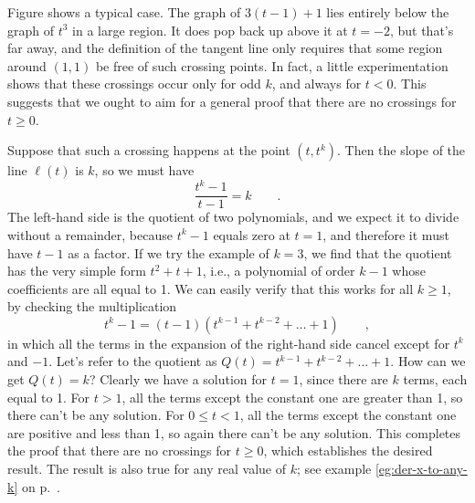 Figure  shows a typical case. 
The graph of $3(t-1)+1$ lies entirely below the graph of $t^3$ in a large region.
It does pop back up above it at $t=-2$, but that's far away, and the definition of
the tangent line only requires that some region around $(1,1)$ be free of such
crossing points. In fact, a little experimentation shows that these crossings occur
only for odd $k$, and always for $t<0$. This suggests that we ought to aim for
a general proof that there are no crossings for $t \ge 0$.


Suppose that such a crossing happens at the point $(t,t^k)$. Then the slope of the
line $\ell(t)$ is $k$, so we must have
\begin{equation*}
  \frac{t^k-1}{t-1} = k \qquad .
\end{equation*}
The left-hand side is the quotient of two polynomials, and we expect it to divide without
a remainder, because $t^k-1$ equals zero at $t=1$, and therefore it must have $t-1$ as a factor.
If we try the example
of $k=3$, we find that the quotient has
the very simple form $t^2+t+1$, i.e., a polynomial of order $k-1$ whose
coefficients are all equal to 1. We can easily verify that this works for
all $k\ge 1$, by checking the multiplication
\begin{equation*}
  t^k-1 = (t-1)(t^{k-1}+t^{k-2}+\ldots+1) \qquad ,
\end{equation*}
in which all the terms in the expansion of the right-hand side cancel except for $t^k$ and $-1$.
Let's refer to the quotient as $Q(t)=t^{k-1}+t^{k-2}+\ldots+1$.
How can we get $Q(t)=k$? Clearly we have a solution for $t=1$, since there are $k$ terms,
each equal to 1. For $t>1$, all the terms except the constant one are greater than 1, so
there can't be any solution. For $0 \le t < 1$, all the terms except the constant
one are positive and less than 1, so again there can't be any solution.
This completes the proof that there are no crossings for $t \ge 0$, which establishes
the desired result. The result is also true for any real value of $k$; see example \ref{eg:der-x-to-any-k}
on p.~\pageref{eg:der-x-to-any-k}.


